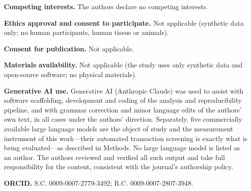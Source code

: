 \documentclass[pdflatex,sn-basic,Numbered]{sn-jnl}
\begin{document}
\textbf{Competing interests.} The authors declare no competing interests.

\textbf{Ethics approval and consent to participate.} Not applicable (synthetic data only; no human participants, human tissue or animals).

\textbf{Consent for publication.} Not applicable.

\textbf{Materials availability.} Not applicable (the study uses only synthetic data and open-source software; no physical materials).

\textbf{Generative AI use.} Generative AI (Anthropic Claude) was used to assist with software scaffolding, development and coding of the analysis and reproducibility pipeline, and with grammar correction and minor language edits of the authors' own text, in all cases under the authors' direction. Separately, five commercially available large language models are the object of study and the measurement instrument of this work---their automated transaction screening is exactly what is being evaluated---as described in Methods. No large language model is listed as an author. The authors reviewed and verified all such output and take full responsibility for the content, consistent with the journal's authorship policy.

\textbf{ORCID.} S.C. 0009-0007-2779-3492; R.C. 0009-0007-2807-3948.


\end{document}
